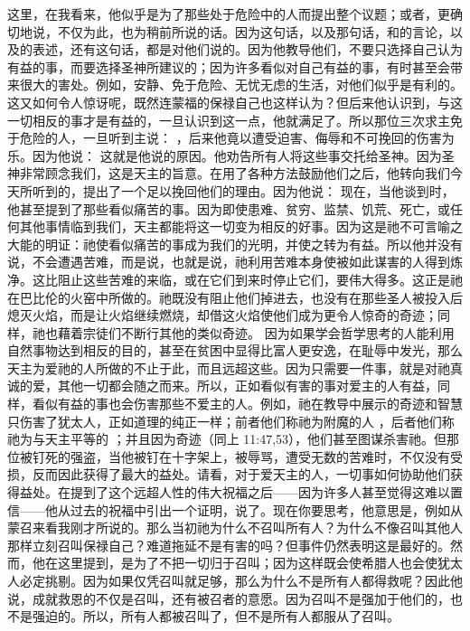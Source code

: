 这里，在我看来，他似乎是为了那些处于危险中的人而提出整个议题；或者，更确切地说，不仅为此，也为稍前所说的话。因为这句话，以及那句话，和的言论，以及的表述，还有这句话，都是对他们说的。因为他教导他们，不要只选择自己认为有益的事，而要选择圣神所建议的；因为许多看似对自己有益的事，有时甚至会带来很大的害处。例如，安静、免于危险、无忧无虑的生活，对他们似乎是有利的。这又如何令人惊讶呢，既然连蒙福的保禄自己也这样认为？但后来他认识到，与这一切相反的事才是有益的，一旦认识到这一点，他就满足了。所以那位三次求主免于危险的人，一旦听到主说： ，后来他竟以遭受迫害、侮辱和不可挽回的伤害为乐。因为他说：  这就是他说的原因。他劝告所有人将这些事交托给圣神。因为圣神非常顾念我们，这是天主的旨意。在用了各种方法鼓励他们之后，他转向我们今天所听到的，提出了一个足以挽回他们的理由。因为他说： 现在，当他谈到时，他甚至提到了那些看似痛苦的事。因为即使患难、贫穷、监禁、饥荒、死亡，或任何其他事情临到我们，天主都能将这一切变为相反的好事。因为这是祂不可言喻之大能的明证：祂使看似痛苦的事成为我们的光明，并使之转为有益。所以他并没有说，不会遭遇苦难，而是说，也就是说，祂利用苦难本身使被如此谋害的人得到炼净。这比阻止这些苦难的来临，或在它们到来时停止它们，要伟大得多。这正是祂在巴比伦的火窑中所做的。祂既没有阻止他们掉进去，也没有在那些圣人被投入后熄灭火焰，而是让火焰继续燃烧，却借这火焰使他们成为更令人惊奇的奇迹；同样，祂也藉着宗徒们不断行其他的类似奇迹。 因为如果学会哲学思考的人能利用自然事物达到相反的目的，甚至在贫困中显得比富人更安逸，在耻辱中发光，那么天主为爱祂的人所做的不止于此，而且远超这些。因为只需要一件事，就是对祂真诚的爱，其他一切都会随之而来。所以，正如看似有害的事对爱主的人有益，同样，看似有益的事也会伤害那些不爱主的人。例如，祂在教导中展示的奇迹和智慧只伤害了犹太人，正如道理的纯正一样；前者他们称祂为附魔的人 ，后者他们称祂为与天主平等的 ；并且因为奇迹（同上 11:47,53），他们甚至图谋杀害祂。但那位被钉死的强盗，当他被钉在十字架上，被辱骂，遭受无数的苦难时，不仅没有受损，反而因此获得了最大的益处。请看，对于爱天主的人，一切事如何协助他们获得益处。在提到了这个远超人性的伟大祝福之后——因为许多人甚至觉得这难以置信——他从过去的祝福中引出一个证明，说了。现在你要思考，他意思是，例如从蒙召来看我刚才所说的。那么当初祂为什么不召叫所有人？为什么不像召叫其他人那样立刻召叫保禄自己？难道拖延不是有害的吗？但事件仍然表明这是最好的。然而，他在这里提到，是为了不把一切归于召叫；因为这样既会使希腊人也会使犹太人必定挑剔。因为如果仅凭召叫就足够，那么为什么不是所有人都得救呢？因此他说，成就救恩的不仅是召叫，还有被召者的意愿。因为召叫不是强加于他们的，也不是强迫的。所以，所有人都被召叫了，但不是所有人都服从了召叫。\par

